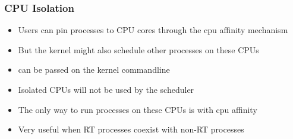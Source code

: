\begin{frame}
        \frametitle{CPU Isolation}
        \begin{itemize}
                \item Users can pin processes to CPU cores through the cpu affinity mechanism
                \item But the kernel might also schedule other processes on these CPUs
                \item {} can be passed on the kernel commandline
                \item Isolated CPUs will not be used by the scheduler
                \item The only way to run processes on these CPUs is with cpu affinity
                \item Very useful when RT processes coexist with non-RT processes
        \end{itemize}
\end{frame}

